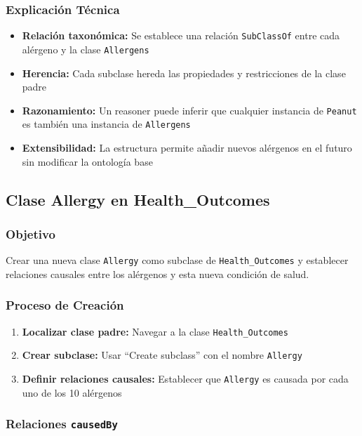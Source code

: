 \documentclass[12pt,a4paper]{article}
\begin{document}
\subsubsection{Explicación Técnica}

\begin{itemize}
    \item \textbf{Relación taxonómica:} Se establece una relación \texttt{SubClassOf} entre cada alérgeno y la clase \texttt{Allergens}
    \item \textbf{Herencia:} Cada subclase hereda las propiedades y restricciones de la clase padre
    \item \textbf{Razonamiento:} Un reasoner puede inferir que cualquier instancia de \texttt{Peanut} es también una instancia de \texttt{Allergens}
    \item \textbf{Extensibilidad:} La estructura permite añadir nuevos alérgenos en el futuro sin modificar la ontología base
\end{itemize}

\subsection{Clase Allergy en Health\_Outcomes}

\subsubsection{Objetivo}

Crear una nueva clase \texttt{Allergy} como subclase de \texttt{Health\_Outcomes} y establecer relaciones causales entre los alérgenos y esta nueva condición de salud.

\subsubsection{Proceso de Creación}

\begin{enumerate}
    \item \textbf{Localizar clase padre:} Navegar a la clase \texttt{Health\_Outcomes}
    \item \textbf{Crear subclase:} Usar ``Create subclass'' con el nombre \texttt{Allergy}
    \item \textbf{Definir relaciones causales:} Establecer que \texttt{Allergy} es causada por cada uno de los 10 alérgenos
\end{enumerate}

\subsubsection{Relaciones \texttt{causedBy}}
\end{document}
